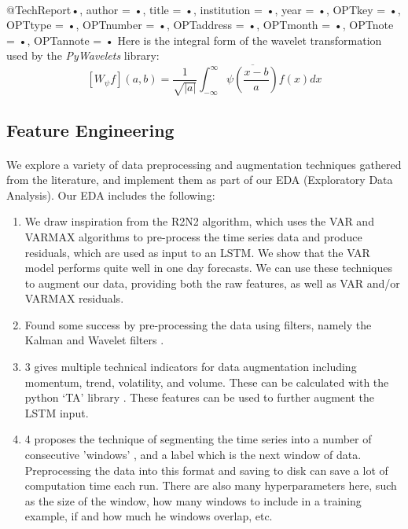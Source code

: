 \documentclass{article}
\begin{document}
\paragraph{}@TechReport{•,
author = {•},
title = {•},
institution = {•},
year = {•},
OPTkey = {•},
OPTtype = {•},
OPTnumber = {•},
OPTaddress = {•},
OPTmonth = {•},
OPTnote = {•},
OPTannote = {•}
}
Here is the integral form of the wavelet transformation used by the \textit{PyWavelets} library:
\[\left[W_\psi f\right](a, b) = \frac{1}{\sqrt{|a|}} \int_{-\infty}^\infty \overline{\psi\left(\frac{x-b}{a}\right)}f(x)dx\]

\subsection{Feature Engineering}

\paragraph{}
We explore a variety of data preprocessing and augmentation techniques gathered from the literature, and implement them as part of our EDA (Exploratory Data Analysis). Our EDA includes the following:

\begin{enumerate}
\item  We draw inspiration from the R2N2 \cite{1_website} algorithm, which uses the VAR and VARMAX algorithms to pre-process the time series data and produce residuals, which are used as input to an LSTM. We show that the VAR model performs quite well in one day forecasts. We can use these techniques to augment our data, providing both the raw features, as well as VAR and/or VARMAX residuals.

\item Found some success by pre-processing the data using filters, namely the Kalman and Wavelet filters \cite{2_website}.

\item 3 \cite{3_website} gives multiple technical indicators for data augmentation including momentum, trend, volatility, and volume. These can be calculated with the python ‘TA’ library . These features can be used to further augment the LSTM input.

\item 4 \cite{4_website} proposes the technique of segmenting the time series into a number of consecutive 'windows'  , and a label which is the next window of data. Preprocessing the data into this format and saving to disk can save a lot of computation time each run. There are also many hyperparameters here, such as the size of the window, how many windows to include in a training example, if and how much he windows overlap, etc.
\end{enumerate}
\end{document}
